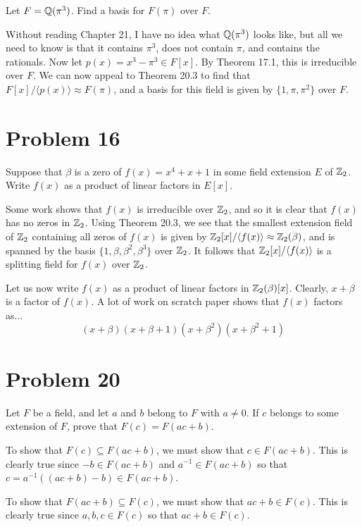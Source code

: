\documentclass{article}
\begin{document}
Let $F=\mathbb{Q}(\pi^3)$.  Find a basis for $F(\pi)$ over $F$.

Without reading Chapter 21, I have no idea what $\mathbb{Q}(\pi^3)$
looks like, but all we need to know is that it contains $\pi^3$,
does not contain $\pi$, and contains the rationals.
Now let $p(x)=x^3-\pi^3\in F[x]$.  By Theorem 17.1, this is
irreducible over $F$.  We can now appeal to Theorem 20.3 to
find that $F[x]/\langle p(x)\rangle\approx F(\pi)$, and
a basis for this field is given by $\{1,\pi,\pi^2\}$ over $F$.

\section*{Problem 16}

Suppose that $\beta$ is a zero of $f(x)=x^4+x+1$ in some field extension $E$
of $\mathbb{Z}_2$.  Write $f(x)$ as a product of linear factors in $E[x]$.

Some work shows that $f(x)$ is irreducible over $\mathbb{Z}_2$, and so it is clear that
$f(x)$ has no zeros in $\mathbb{Z}_2$.  Using Theorem 20.3, we see that the smallest
extension field of $\mathbb{Z}_2$ containing all zeros of $f(x)$ is given by
$\mathbb{Z}_2[x]/\langle f(x)\rangle\approx \mathbb{Z}_2(\beta)$,
and is spanned by the basis $\{1,\beta,\beta^2,\beta^3\}$
over $\mathbb{Z}_2$.  It follows that $\mathbb{Z}_2[x]/\langle f(x)\rangle$ is a splitting field
for $f(x)$ over $\mathbb{Z}_2$.

Let us now write $f(x)$ as a product of linear factors in $\mathbb{Z}_2(\beta)[x]$.
Clearly, $x+\beta$ is a factor of $f(x)$.  A lot of work on scratch paper shows that
$f(x)$ factors as...
\begin{equation*}
(x+\beta)(x+\beta+1)(x+\beta^2)(x+\beta^2+1)
\end{equation*}

\section*{Problem 20}

Let $F$ be a field, and let $a$ and $b$ belong to $F$ with $a\neq 0$.
If $c$ belongs to some extension of $F$, prove that $F(c)=F(ac+b)$.

To show that $F(c)\subseteq F(ac+b)$, we must show that $c\in F(ac+b)$.
This is clearly true since $-b\in F(ac+b)$ and $a^{-1}\in F(ac+b)$ so
that $c=a^{-1}((ac+b)-b)\in F(ac+b)$.

To show that $F(ac+b)\subseteq F(c)$, we must show that $ac+b\in F(c)$.
This is clearly true since $a,b,c\in F(c)$ so that $ac+b\in F(c)$.
\end{document}
